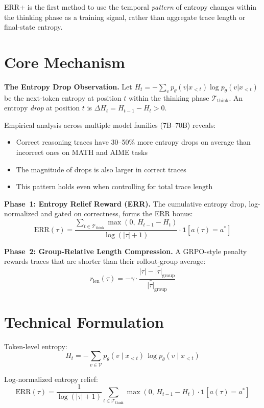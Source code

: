 \documentclass[10pt,twocolumn]{article}
\begin{document}
ERR+ is the first method to use the temporal \emph{pattern} of entropy
changes within the thinking phase as a training signal, rather than
aggregate trace length or final-state entropy.

\section{Core Mechanism}

\textbf{The Entropy Drop Observation.} Let $H_t = -\sum_v p_\theta(v|x_{<t})
\log p_\theta(v|x_{<t})$ be the next-token entropy at position $t$ within
the thinking phase $\mathcal{T}_{\mathrm{think}}$. An entropy \emph{drop}
at position $t$ is $\Delta H_t = H_{t-1} - H_t > 0$.

Empirical analysis across multiple model families (7B--70B) reveals:
\begin{itemize}[itemsep=2pt,parsep=0pt]
  \item Correct reasoning traces have 30--50\% more entropy drops on
    average than incorrect ones on MATH and AIME tasks
  \item The magnitude of drops is also larger in correct traces
  \item This pattern holds even when controlling for total trace length
\end{itemize}

\textbf{Phase~1: Entropy Relief Reward (ERR).} The cumulative entropy
drop, log-normalized and gated on correctness, forms the ERR bonus:
\[
\mathrm{ERR}(\tau)
= \frac{\sum_{t\in\mathcal{T}_{\mathrm{think}}}
      \max(0,\,H_{t-1}-H_t)}
      {\log(|\tau|+1)}
  \cdot \mathbf{1}[a(\tau)=a^*]
\]

\textbf{Phase~2: Group-Relative Length Compression.} A GRPO-style penalty
rewards traces that are shorter than their rollout-group average:
\[
r_{\mathrm{len}}(\tau)
= -\gamma\cdot\frac{|\tau| - \bar{|\tau|}_{\mathrm{group}}}
                   {\bar{|\tau|}_{\mathrm{group}}}
\]

\section{Technical Formulation}

Token-level entropy:
\[
H_t = -\sum_{v\in\mathcal{V}}
  p_\theta(v\mid x_{<t})\,\log p_\theta(v\mid x_{<t})
\]

Log-normalized entropy relief:
\[
\mathrm{ERR}(\tau)
= \frac{1}{\log(|\tau|+1)}
  \sum_{t\in\mathcal{T}_{\mathrm{think}}}
  \max(0,\,H_{t-1}-H_t)
  \cdot \mathbf{1}[a(\tau)=a^*]
\]
\end{document}
